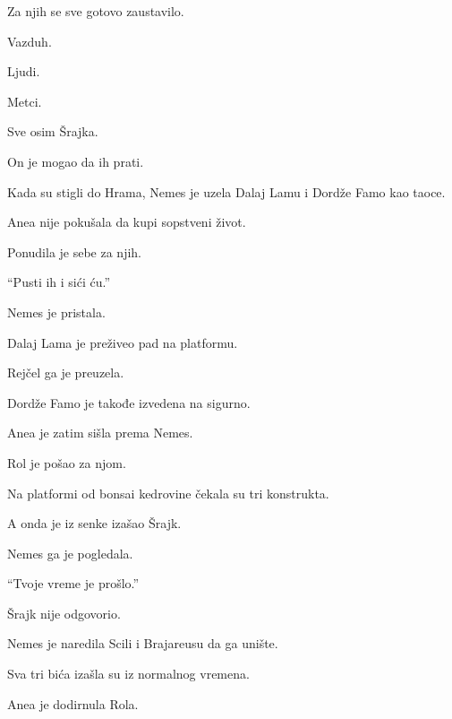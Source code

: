 Za njih se sve gotovo zaustavilo.

\bigskip

Vazduh.

Ljudi.

Metci.

\bigskip

Sve osim Šrajka.

\bigskip

On je mogao da ih prati.

\bigskip

Kada su stigli do Hrama, Nemes je uzela Dalaj Lamu i Dordže Famo kao taoce.

\bigskip

Anea nije pokušala da kupi sopstveni život.

\bigskip

Ponudila je sebe za njih.

\bigskip

``Pusti ih i sići ću.''

\bigskip

Nemes je pristala.

\bigskip

Dalaj Lama je preživeo pad na platformu.

Rejčel ga je preuzela.

Dordže Famo je takođe izvedena na sigurno.

\bigskip

Anea je zatim sišla prema Nemes.

\bigskip

Rol je pošao za njom.

\bigskip

Na platformi od bonsai kedrovine čekala su tri konstrukta.

\bigskip

A onda je iz senke izašao Šrajk.

\bigskip

Nemes ga je pogledala.

``Tvoje vreme je prošlo.''

\bigskip

Šrajk nije odgovorio.

\bigskip

Nemes je naredila Scili i Brajareusu da ga unište.

\bigskip

Sva tri bića izašla su iz normalnog vremena.

\bigskip

Anea je dodirnula Rola.

